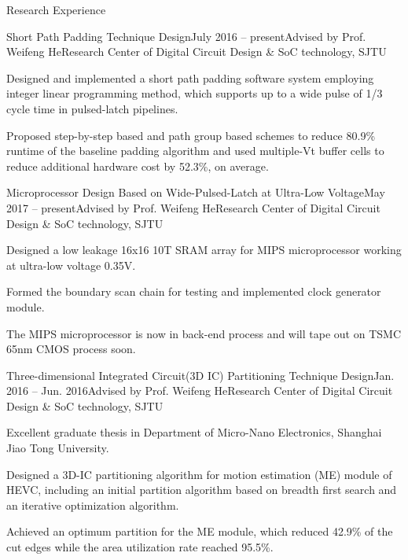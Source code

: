 \documentclass{resume_Stanford} %
\begin{document}
\begin{rSection}{Research Experience}

\begin{rSubsection}{Short Path Padding Technique Design}{July 2016 -- present}{Advised by Prof. Weifeng He}{Research Center of Digital Circuit Design \& SoC technology, SJTU}
\item Designed and implemented a short path padding software system employing integer linear programming method, which supports up to a wide pulse of 1/3 cycle time in pulsed-latch pipelines.
\item Proposed step-by-step based and path group based schemes to reduce 80.9\% runtime of the baseline padding algorithm and used multiple-Vt buffer cells to reduce additional hardware cost by 52.3\%, on average. 
\end{rSubsection}

\begin{rSubsection}{Microprocessor Design Based on Wide-Pulsed-Latch at Ultra-Low Voltage}{May 2017 -- present}{Advised by Prof. Weifeng He}{Research Center of Digital Circuit Design \& SoC technology, SJTU}
\item Designed a low leakage 16x16 10T SRAM array for MIPS microprocessor working at ultra-low voltage 0.35V.
\item Formed the boundary scan chain for testing and implemented clock generator module. 
\item The MIPS microprocessor is now in back-end process and will tape out on TSMC 65nm CMOS process soon.
\end{rSubsection}

\begin{rSubsection}{Three-dimensional Integrated Circuit(3D IC) Partitioning Technique Design}{Jan. 2016 -- Jun. 2016}{Advised by Prof. Weifeng He}{Research Center of Digital Circuit Design \& SoC technology, SJTU}
\item Excellent graduate thesis in Department of Micro-Nano Electronics, Shanghai Jiao Tong University.
\item Designed a 3D-IC partitioning algorithm for motion estimation (ME) module of HEVC, including an initial partition algorithm based on breadth first search and an iterative optimization algorithm.
\item Achieved an optimum partition for the ME module, which reduced 42.9\% of the cut edges while the area utilization rate reached 95.5\%.
\end{rSubsection}


\end{rSection}
\end{document}
